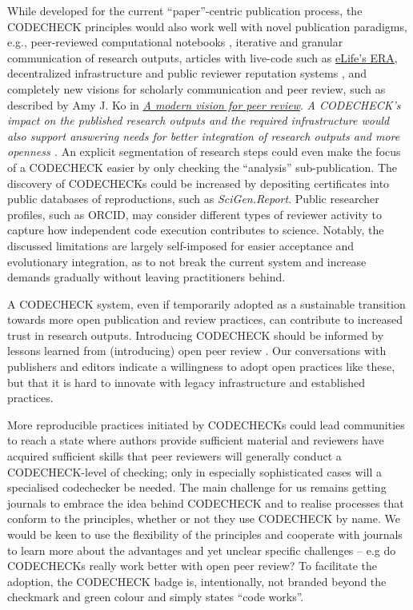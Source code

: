 \documentclass[12pt]{article}
\newcommand{\rev}[1]{\textit{#1}}
\begin{document}
While developed for the current ``paper''-centric publication process,
the CODECHECK principles would also work well with novel publication
paradigms, e.g., peer-reviewed computational notebooks
\cite{earthcube_new_2020}, iterative and granular communication of
research outputs, articles with live-code
\cite{perkel_pioneering_2019-1} such as \href{https://elifesciences.org/labs/dc5acbde/welcome-to-a-new-era-of-reproducible-publishing}{eLife's ERA},
decentralized infrastructure and public reviewer reputation systems
\cite{tenorio-fornes_towards_2019}, and completely new visions for
scholarly communication and peer review, such as described by Amy J. Ko
in \href{https://medium.com/bits-and-behavior/a-modern-vision-for-peer-review-d5f73f0fae07}{\emph{A modern vision for peer review}}.
\rev{A CODECHECK's impact on the published research outputs and the required
infrastructure would also support answering needs for better integration of research 
outputs and more openness \cite{eosc2020}.}
An explicit segmentation of research steps could even make the focus
of a CODECHECK easier by only checking the ``analysis''
sub-publication.  The discovery of CODECHECKs could be increased by
depositing certificates into public databases of reproductions, such as
\emph{SciGen.Report}.  Public researcher profiles, such as ORCID, may
consider different types of reviewer activity to capture how
independent code execution contributes to science.  Notably, the
discussed limitations are largely self-imposed for easier acceptance
and evolutionary integration, as to not break the current system and
increase demands gradually without leaving practitioners behind.

A CODECHECK system, even if temporarily adopted as a sustainable
transition towards more open publication and review practices, can
contribute to increased trust in research outputs. Introducing
CODECHECK should be informed by lessons learned from (introducing)
open peer review \cite{ross-hellauer_guidelines_2019}.  Our
conversations with publishers and editors indicate a willingness to
adopt open practices like these, but that it is hard to innovate with
legacy infrastructure and established practices.


More reproducible practices initiated by CODECHECKs could lead
communities to reach a state where authors provide sufficient material
and reviewers have acquired sufficient skills that peer reviewers will
generally conduct a CODECHECK-level of checking; only in especially
sophisticated cases will a specialised codechecker be needed.  The
main challenge for us remains getting journals to embrace the idea
behind CODECHECK and to realise processes that conform to the
principles, whether or not they use CODECHECK by name.  We would be
keen to use the flexibility of the principles and cooperate with
journals to learn more about the advantages and yet unclear specific
challenges -- e.g do CODECHECKs really work better with open peer review?  To
facilitate the adoption, the CODECHECK badge is, intentionally, not
branded beyond the checkmark and green colour and simply states ``code
works''.
\end{document}
